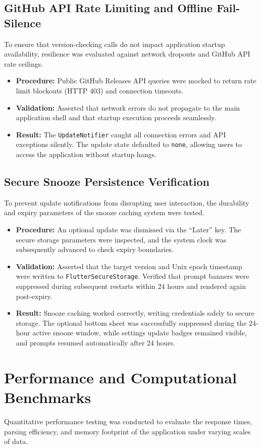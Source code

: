 \subsection{GitHub API Rate Limiting and Offline Fail-Silence}
To ensure that version-checking calls do not impact application startup availability, resilience was evaluated against network dropouts and GitHub API rate ceilings.
\begin{itemize}
    \item \textbf{Procedure:} Public GitHub Releases API queries were mocked to return rate limit blockouts (HTTP 403) and connection timeouts.
    \item \textbf{Validation:} Asserted that network errors do not propagate to the main application shell and that startup execution proceeds seamlessly.
    \item \textbf{Result:} The \texttt{UpdateNotifier} caught all connection errors and API exceptions silently. The update state defaulted to \texttt{none}, allowing users to access the application without startup hangs.
\end{itemize}

\subsection{Secure Snooze Persistence Verification}
To prevent update notifications from disrupting user interaction, the durability and expiry parameters of the snooze caching system were tested.
\begin{itemize}
    \item \textbf{Procedure:} An optional update was dismissed via the ``Later'' key. The secure storage parameters were inspected, and the system clock was subsequently advanced to check expiry boundaries.
    \item \textbf{Validation:} Asserted that the target version and Unix epoch timestamp were written to \texttt{FlutterSecureStorage}. Verified that prompt banners were suppressed during subsequent restarts within 24 hours and rendered again post-expiry.
    \item \textbf{Result:} Snooze caching worked correctly, writing credentials safely to secure storage. The optional bottom sheet was successfully suppressed during the 24-hour active snooze window, while settings update badges remained visible, and prompts resumed automatically after 24 hours.
\end{itemize}

\section{Performance and Computational Benchmarks}
Quantitative performance testing was conducted to evaluate the response times, parsing efficiency, and memory footprint of the application under varying scales of data.

